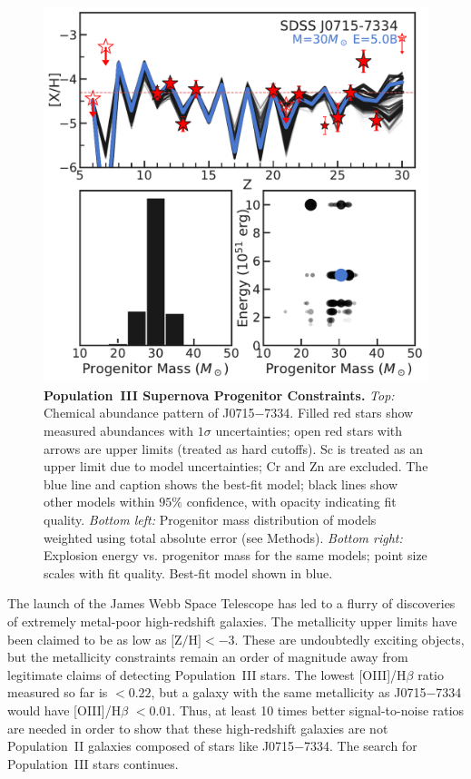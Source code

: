 \documentclass{natureprintstyle}
\newcommand{\umpstar}{J0715$-$7334\xspace}
\begin{document}
\begin{figure}[h!]
    \centering
    \includegraphics[width=\linewidth]{nature_pop3fit.pdf}
    \caption{\textbf{Population~III Supernova Progenitor Constraints.}
    \textit{Top:} Chemical abundance pattern of \umpstar. Filled red stars show measured abundances with $1\sigma$ uncertainties; open red stars with arrows are upper limits (treated as hard cutoffs). Sc is treated as an upper limit due to model uncertainties; Cr and Zn are excluded\cite{Heger2010}. The blue line and caption shows the best-fit model; black lines show other models within $95\%$ confidence, with opacity indicating fit quality.
    \textit{Bottom left:} Progenitor mass distribution of models weighted using total absolute error (see Methods).
    \textit{Bottom right:} Explosion energy vs. progenitor mass for the same models; point size scales with fit quality. Best-fit model shown in blue.
    }
    \label{fig:popiii}
\end{figure}

The launch of the James Webb Space Telescope has led to a flurry of discoveries of extremely metal-poor high-redshift galaxies\cite{Fujimoto2025,Nakajima2025,Morishita2025}.
The metallicity upper limits have been claimed to be as low as $\mbox{[Z/H]} < -3$.
These are undoubtedly exciting objects, but the metallicity constraints remain an order of magnitude away from legitimate claims of detecting Population~III stars.
The lowest [OIII]/H$\beta$ ratio measured so far is $<0.22$\cite{Morishita2025}, but a galaxy with the same metallicity as \umpstar would have [OIII]/H$\beta$ $< 0.01$\cite{Katz2023}.
Thus, at least 10 times better signal-to-noise ratios are needed in order to show that these high-redshift galaxies are not Population~II galaxies composed of stars like \umpstar.
The search for Population~III stars continues.
\end{document}
